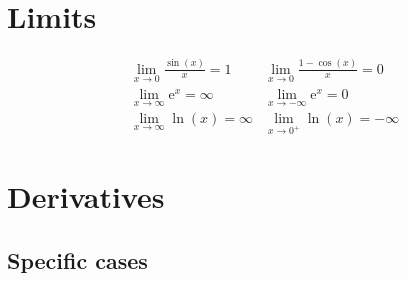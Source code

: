 \documentclass[letterpaper,9pt,fleqn]{extarticle}
\begin{document}
\begin{multicols*}{3}
\begin{minipage}[c]{0.333\textwidth}
\section*{Limits}
\vspace{-0.4in}
\begin{align*}
 &\lim_{x \to 0}   \frac{\sin(x)}{x} = 1  & \lim_{x \to 0}   \frac{1-\cos(x)}{x} = 0 \\
 &\lim_{x \to \infty} \mathrm{e}^x = \infty & \lim_{x \to -\infty} \mathrm{e}^x = 0\\
  &\lim_{x \to \infty} \ln(x)  = \infty & \lim_{x \to 0^{+}} \ln(x)  = -\infty
 \end{align*}
\end{minipage}  
 \vspace{-0.2in}
\section*{\textbf{Derivatives}}
\vspace{-0.35in}
\subsection*{Specific cases}


\end{multicols*}
\end{document}
